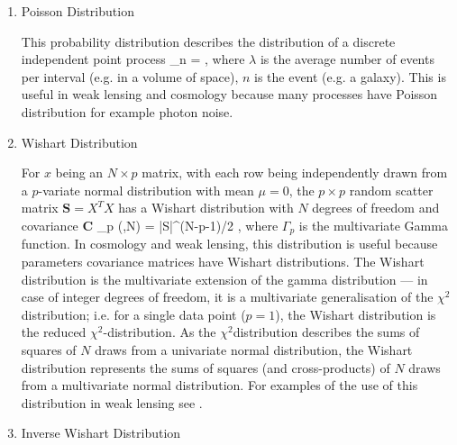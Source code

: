 {\begin{enumerate}
For $x_{n}$ is drawn from `standard' normal distribution, then $X=\sum_{n}^{N}x_{n}^{2}$ has a $\chi^{2}$ distribution with $N$ degrees of freedom
%
\be
\chi_{N}^{2}\left(X\right)=\left(\right)^{1/2}X^{N/2-1}\exp{} \ ,
\label{eq:PD.5}
\ee
%
where $\Gamma(N/2)$ is Gamma function. If $x_{n}$ has mean $\mu$ and variance $\sigma^{2}$ then $X=\frac{1}{\sigma^{2}}\sum_{n}^{N}\left(x_{n}-\mu\right)^2$ has a $\chi^{2}$ distribution with $\left(N-1\right)$ degrees of freedom.
\\
\item Poisson Distribution 

This probability distribution describes the distribution of a discrete independent point process
%
\be
{}_n =  \exp{(-\lambda)} \; ,
\label{eq:PD.6}
\ee
%
where $\lambda$ is the average number of events per interval (e.g. in a volume of space), $n$ is the event (e.g. a galaxy). 
This is useful in weak lensing and cosmology because many processes have Poisson distribution for example 
photon noise. 
\\
\item Wishart Distribution

For $x$ being an $N\times p$ matrix, with each row being independently drawn from a $p$-variate normal distribution with mean $\mu=0$, 
the $p\times p$ random scatter matrix $\mathbf{S}=X^TX$ has a Wishart distribution with $N$ degrees of freedom and covariance $\mathbf{C}$
%
\be
{}_p \left(,N\right) = 
\left|S\right|^{(N-p-1)/2}
\exp{}\; ,
\label{eq:PD.7}
\ee
%
where $\Gamma_p$ is the multivariate Gamma function. 
In cosmology and weak lensing, this distribution is useful because parameters covariance matrices have Wishart distributions.
 The Wishart distribution is the multivariate extension of the gamma distribution --- in case of integer degrees of freedom, 
it is a multivariate generalisation of the $\chi^2$distribution; i.e. for a single data point ($p=1$), 
the Wishart distribution is the reduced $\chi^2$-distribution. As the $\chi^2$distribution describes the sums 
of squares of $N$ draws from a univariate normal distribution, the Wishart distribution represents the sums 
of squares (and cross-products) of $N$ draws from a multivariate normal distribution. For examples of the use of this distribution in 
weak lensing see \cite{2013MNRAS.432.1928T,2014IAUS..306...99J}. 
\\
\item Inverse Wishart Distribution


\end{enumerate}}

